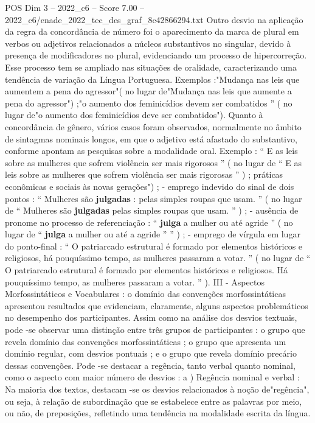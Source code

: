 \begin{textsample}{POS Dim 3 – 2022\_c6 – Score 7.00 – 2022\_c6/enade\_2022\_tec\_des\_graf\_8c42866294.txt}
Outro desvio na aplicação da regra da concordância de número foi o aparecimento da marca de plural em verbos ou adjetivos relacionados a núcleos substantivos no singular, devido à presença de modificadores no plural, evidenciando um processo de hipercorreção.
Esse processo tem se ampliado nas situações de oralidade, caracterizando uma tendência de variação da Língua Portuguesa.
Exemplos :"Mudança nas leis que aumentem a pena do agressor"( no lugar de"Mudança nas leis que aumente a pena do agressor") ;"o aumento dos feminicídios devem ser combatidos ” ( no lugar de"o aumento dos feminicídios deve ser combatidos").
Quanto à concordância de gênero, vários casos foram observados, normalmente no âmbito de sintagmas nominais longos, em que o adjetivo está afastado do substantivo, conforme apontam as pesquisas sobre a modalidade oral.
Exemplo : “ E as leis sobre as mulheres que sofrem violência ser mais rigorosos ” ( no lugar de “ E as leis sobre as mulheres que sofrem violência ser mais rigorosas ” ) ; práticas econômicas e sociais às novas gerações") ; - emprego indevido do sinal de dois pontos : “ Mulheres são \textbf{julgadas} : pelas simples roupas que usam. ” ( no lugar de “ Mulheres são \textbf{julgadas} pelas simples roupas que usam. ” ) ; - ausência de pronome no processo de referenciação : “ \textbf{julga} a mulher ou até agride ” ( no lugar de “ \textbf{julga} a mulher ou até a agride ” ” ) ; - emprego de vírgula em lugar do ponto-final : “ O patriarcado estrutural é formado por elementos históricos e religiosos, há pouquíssimo tempo, as mulheres passaram a votar. ” ( no lugar de “ O patriarcado estrutural é formado por elementos históricos e religiosos.
Há pouquíssimo tempo, as mulheres passaram a votar. ” ).
III - Aspectos Morfossintáticos e Vocabulares : o domínio das convenções morfossintáticas apresentou resultados que evidenciam, claramente, alguns aspectos problemáticos no desempenho dos participantes.
Assim como na análise dos desvios textuais, pode -se observar uma distinção entre três grupos de participantes : o grupo que revela domínio das convenções morfossintáticas ; o grupo que apresenta um domínio regular, com desvios pontuais ; e o grupo que revela domínio precário dessas convenções.
Pode -se destacar a regência, tanto verbal quanto nominal, como o aspecto com maior número de desvios : a ) Regência nominal e verbal : Na maioria dos textos, destacam -se os desvios relacionados à noção de"regência", ou seja, à relação de subordinação que se estabelece entre as palavras por meio, ou não, de preposições, refletindo uma tendência na modalidade escrita da língua.

\end{textsample}
